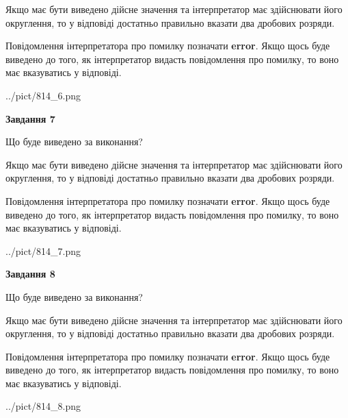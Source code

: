\documentclass[12pt, ukrainian]{article}
\begin{document}
{\begin {Large}
Якщо має бути виведено дійсне значення та інтерпретатор має здійснювати його округлення, 
то у відповіді достатньо правильно вказати два дробових розряди.

Повідомлення інтерпретатора про помилку позначати \textbf{error}.
Якщо щось буде виведено до того, як інтерпретатор видасть повідомлення про помилку, 
то воно має вказуватись у відповіді. \par

\begin{center}
	{../pict/814_6.png}
\end{center}
\newpage

{\begin {center}\textbf{Завдання 7}\end {center}}\par
Що буде виведено за виконання? \par

Якщо має бути виведено дійсне значення та інтерпретатор має здійснювати його округлення, 
то у відповіді достатньо правильно вказати два дробових розряди.

Повідомлення інтерпретатора про помилку позначати \textbf{error}.
Якщо щось буде виведено до того, як інтерпретатор видасть повідомлення про помилку, 
то воно має вказуватись у відповіді. \par

\begin{center}
	{../pict/814_7.png}
\end{center}
\newpage

{\begin {center}\textbf{Завдання 8}\end {center}}\par
Що буде виведено за виконання? \par

Якщо має бути виведено дійсне значення та інтерпретатор має здійснювати його округлення, 
то у відповіді достатньо правильно вказати два дробових розряди.

Повідомлення інтерпретатора про помилку позначати \textbf{error}.
Якщо щось буде виведено до того, як інтерпретатор видасть повідомлення про помилку, 
то воно має вказуватись у відповіді. \par

\begin{center}
	{../pict/814_8.png}
\end{center}
\newpage


\end{Large}}
\end{document}

